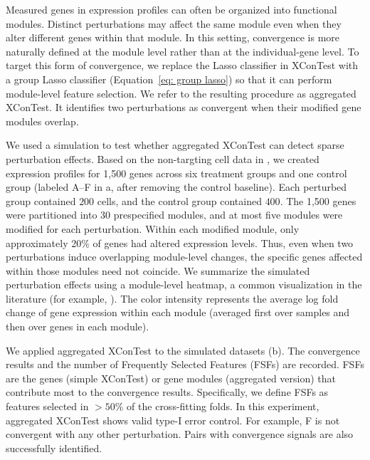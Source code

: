 \documentclass[11pt]{article}
\newenvironment{revblockr3}
  {\color[RGB]{210,110,110}}
  {}
\begin{document}
\begin{revblockr3}
Measured genes in expression profiles can often be organized into functional modules. Distinct perturbations may affect the same module even when they alter different genes within that module. In this setting, convergence is more naturally defined at the module level rather than at the individual-gene level. To target this form of convergence, we replace the Lasso classifier in XConTest with a group Lasso classifier (Equation~\eqref{eq: group lasso}) so that it can perform module-level feature selection. We refer to the resulting procedure as aggregated XConTest. It identifies two perturbations as convergent when their modified gene modules overlap.

We used a simulation to test whether aggregated XConTest can detect sparse perturbation effects. Based on the non-targting cell data in \cite{shi2026genome}, we created expression profiles for 1,500 genes across six treatment groups and one control group (labeled A--F in a, after removing the control baseline). Each perturbed group contained $200$ cells, and the control group contained $400$. The 1,500 genes were partitioned into 30 prespecified modules, and at most five modules were modified for each perturbation. Within each modified module, only approximately 20\% of genes had altered expression levels. Thus, even when two perturbations induce overlapping module-level changes, the specific genes affected within those modules need not coincide. We summarize the simulated perturbation effects using a module-level heatmap, a common visualization in the literature (for example, \cite{schnitzler2024convergence}). The color intensity represents the average log fold change of gene expression within each module (averaged first over samples and then over genes in each module).

We applied aggregated XConTest to the simulated datasets (b). The convergence results and the number of Frequently Selected Features (FSFs) are recorded. FSFs are the genes (simple XConTest) or gene modules (aggregated version) that contribute most to the convergence results. Specifically, we define FSFs as features selected in $>50\%$ of the cross-fitting folds. In this experiment, aggregated XConTest shows valid type-I error control. For example, F is not convergent with any other perturbation. Pairs with convergence signals are also successfully identified.


\end{revblockr3}
\end{document}
